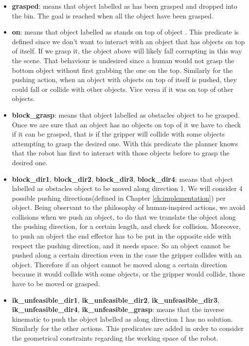 \begin{itemize}
\item \textbf{grasped}:  means that object labelled as  has been grasped and dropped into the bin. The goal is reached when all the object have been grasped. 
\item \textbf{on}: means that object labelled as  stands on top of object . This predicate is defined since we don't want to interact with an object that has objects on top of itself. If we grasp it, the object above will likely fall corrupting in this way the scene. That behaviour is undesired since a human would not grasp the bottom object without first grabbing the one on the top. Similarly for the pushing action, when an object with objects on top of itself is pushed, they could fall or collide with other objects. Vice versa if it was on top of other objects.
\item \textbf{block\_grasp}:  means that object labelled as  obstacles  object  to be grasped. 
Once we are sure that an object has no objects on top of it we have to check if it can be grasped, that is if the gripper will collide with some objects attempting to grasp the desired one. With this predicate the planner knows that the robot has first to interact with those objects before to grasp the desired one.
\item \textbf{block\_dir1}, \textbf{block\_dir2}, \textbf{block\_dir3}, \textbf{block\_dir4}:  means that object labelled as  obstacles  object  to be moved along direction 1. We will consider 4 possible pushing directions(defined in Chapter \ref{ch:implementation}) per object. Being observant to the philosophy  of human-inspired actions, we avoid collisions when we push an object, to do that we translate the object along the pushing direction, for a certain length, and check for collision. Moreover, to push an object the end effector has to be put in the opposite side with respect the pushing direction, and it needs space. So an object cannot be pushed along a certain direction even in the case the gripper collides with an object.
Therefore if an object cannot be moved along a certain direction because it would collide with some objects, or the gripper would collide, those have to be moved or grasped.
\item \textbf{ik\_unfeasible\_dir1}, \textbf{ik\_unfeasible\_dir2}, \textbf{ik\_unfeasible\_dir3}, \textbf{ik\_unfeasible\_dir4}, \textbf{ik\_unfeasible\_grasp}:  means that the inverse kinematic to push the object labelled as  along direction 1 has no solution. Similarly for the other actions. This predicates are added in order to consider the geometrical constraints regarding the working space of the robot.
\end{itemize}

